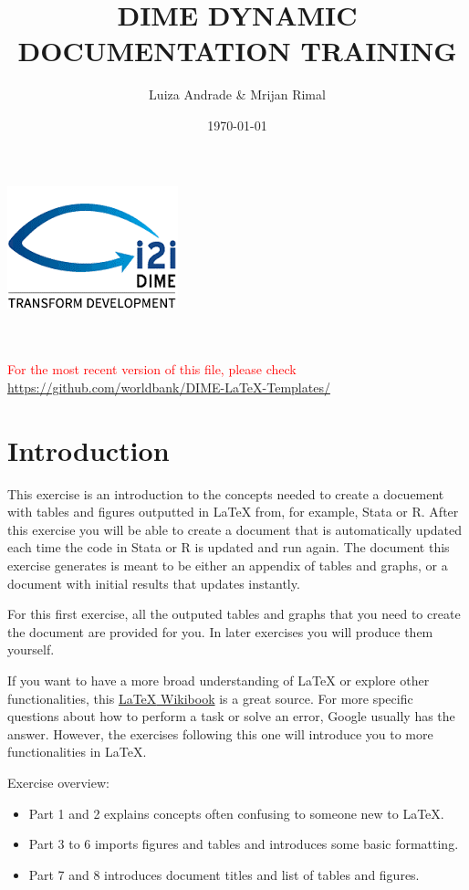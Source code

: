 \documentclass[12pts]{article}
\title{DIME DYNAMIC DOCUMENTATION TRAINING }
\author{Luiza Andrade \& Mrijan Rimal}
\date{\today}
\begin{document}
	
	
	\makeatletter
	\begin{titlepage}
		\begin{center}
			\includegraphics[width=0.3\linewidth]{../img/i2i.png}\\[10ex]
			{\LARGE \bfseries  \@title }\\[2ex] 
			{\Large  \@author}\\[20ex] 
			{\large \@date}
		\end{center}
		\vspace{5cm}
		\textcolor{red}{For the most recent version of this file, please check \url{https://github.com/worldbank/DIME-LaTeX-Templates/}}
	\end{titlepage}
	\makeatother
	
	\tableofcontents
	
	\newpage
	\section*{Introduction}
	This exercise is an introduction to the concepts needed to create a docuement with tables and figures outputted in {\LaTeX} from, for example, Stata or R. After this exercise you will be able to create a document that is automatically updated each time the code in Stata or R is updated and run again. The document this exercise generates is meant to be either an appendix of tables and graphs, or a document with initial results that updates instantly.
	
	For this first exercise, all the outputed tables and graphs that you need to create the document are provided for you. In later exercises you will produce them yourself.
	
	If you want to have a more broad understanding of {\LaTeX} or explore other functionalities, this \href{https://en.wikibooks.org/wiki/LaTeX
	}{{\LaTeX} Wikibook} is a great source. For more specific questions about how to perform a task or solve an error, Google usually has the answer. However, the exercises following this one will introduce you to more functionalities in {\LaTeX}.
	
	Exercise overview:
	\begin{itemize}
		\item Part 1 and 2 explains concepts often confusing to someone new to {\LaTeX}.
		\item Part 3 to 6 imports figures and tables and introduces some basic formatting.
		\item Part 7 and 8 introduces document titles and list of tables and figures.
	\end{itemize}
	
\end{document}
